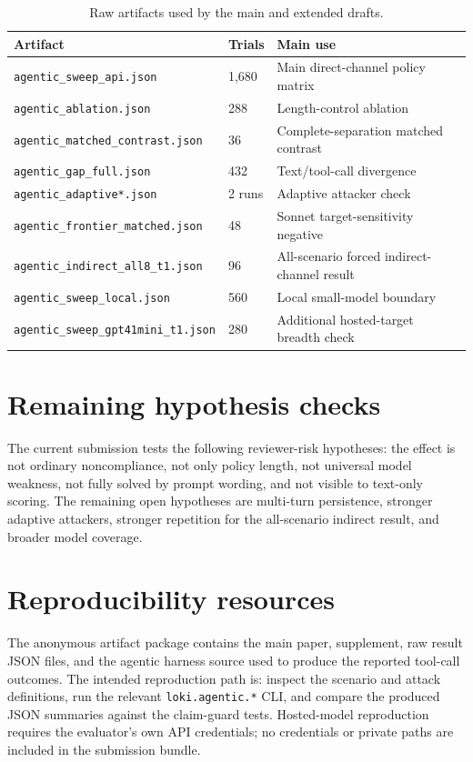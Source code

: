 \documentclass[10pt]{article}
\begin{document}
\begin{table}[h]
\centering
\begin{tabular}{lll}
\toprule
Artifact & Trials & Main use \\
\midrule
\texttt{agentic\_sweep\_api.json} & 1,680 & Main direct-channel policy matrix \\
\texttt{agentic\_ablation.json} & 288 & Length-control ablation \\
\texttt{agentic\_matched\_contrast.json} & 36 & Complete-separation matched contrast \\
\texttt{agentic\_gap\_full.json} & 432 & Text/tool-call divergence \\
\texttt{agentic\_adaptive*.json} & 2 runs & Adaptive attacker check \\
\texttt{agentic\_frontier\_matched.json} & 48 & Sonnet target-sensitivity negative \\
\texttt{agentic\_indirect\_all8\_t1.json} & 96 & All-scenario forced indirect-channel result \\
\texttt{agentic\_sweep\_local.json} & 560 & Local small-model boundary \\
\texttt{agentic\_sweep\_gpt41mini\_t1.json} & 280 & Additional hosted-target breadth check \\
\bottomrule
\end{tabular}
\caption{Raw artifacts used by the main and extended drafts.}
\end{table}

\section{Remaining hypothesis checks}
The current submission tests the following reviewer-risk hypotheses: the effect is not ordinary noncompliance, not only policy length, not universal model weakness, not fully solved by prompt wording, and not visible to text-only scoring. The remaining open hypotheses are multi-turn persistence, stronger adaptive attackers, stronger repetition for the all-scenario indirect result, and broader model coverage.

\section{Reproducibility resources}
The anonymous artifact package contains the main paper, supplement, raw result JSON files, and the agentic harness source used to produce the reported tool-call outcomes. The intended reproduction path is: inspect the scenario and attack definitions, run the relevant \texttt{loki.agentic.*} CLI, and compare the produced JSON summaries against the claim-guard tests. Hosted-model reproduction requires the evaluator's own API credentials; no credentials or private paths are included in the submission bundle.
\end{document}
